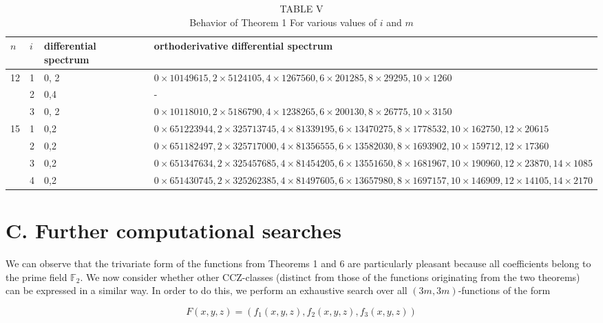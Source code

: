 \documentclass[10pt]{article}
\begin{document}
\begin{table}[h]
\begin{center}
\captionsetup{labelformat=empty}
\caption{TABLE V\\
Behavior of Theorem 1 For various values of $i$ and $m$}
\begin{tabular}{|l|l|l|l|}
\hline
$n$ & $i$ & differential spectrum & orthoderivative differential spectrum \\
\hline
\multirow[t]{3}{*}{12} & 1 & 0, 2 & $0 \times 10149615,2 \times 5124105,4 \times 1267560,6 \times 201285,8 \times 29295,10 \times 1260$ \\
\hline
 & 2 & 0,4 & - \\
\hline
 & 3 & 0, 2 & $0 \times 10118010,2 \times 5186790,4 \times 1238265,6 \times 200130,8 \times 26775,10 \times 3150$ \\
\hline
15 & 1 & 0,2 & $0 \times 651223944,2 \times 325713745,4 \times 81339195,6 \times 13470275,8 \times 1778532,10 \times 162750,12 \times 20615$ \\
\hline
 & 2 & 0,2 & $0 \times 651182497,2 \times 325717000,4 \times 81356555,6 \times 13582030,8 \times 1693902,10 \times 159712,12 \times 17360$ \\
\hline
 & 3 & 0,2 & $0 \times 651347634,2 \times 325457685,4 \times 81454205,6 \times 13551650,8 \times 1681967,10 \times 190960,12 \times 23870,14 \times 1085$ \\
\hline
 & 4 & 0,2 & $0 \times 651430745,2 \times 325262385,4 \times 81497605,6 \times 13657980,8 \times 1697157,10 \times 146909,12 \times 14105,14 \times 2170$ \\
\hline
\end{tabular}
\end{center}
\end{table}

\section*{C. Further computational searches}
We can observe that the trivariate form of the functions from Theorems 1 and 6 are particularly pleasant because all coefficients belong to the prime field $\mathbb{F}_{2}$. We now consider whether other CCZ-classes (distinct from those of the functions originating from the two theorems) can be expressed in a similar way. In order to do this, we perform an exhaustive search over all $(3 m, 3 m)$-functions of the form

$$
F(x, y, z)=\left(f_{1}(x, y, z), f_{2}(x, y, z), f_{3}(x, y, z)\right)
$$
\end{document}
